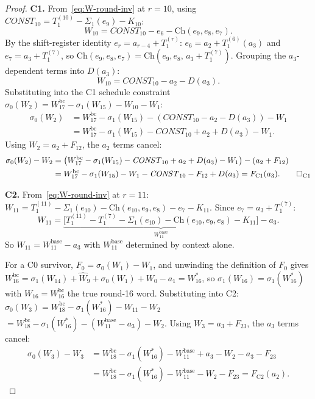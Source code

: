 \documentclass[11pt,a4paper]{article}
\newcommand{\Sig}[1]{\Sigma_{#1}}
\newcommand{\sig}[1]{\sigma_{#1}}
\newcommand{\Ch}{\mathrm{Ch}}
\begin{document}
\begin{proof}
\textbf{C1.}  From~\eqref{eq:W-round-inv} at $r=10$,
using $\mathit{CONST}_{10} = T_1^{(10)} - \Sig{1}(e_9) - K_{10}$:
\[
  W_{10} = \mathit{CONST}_{10} - e_6 - \Ch(e_9,e_8,e_7).
\]
By the shift-register identity $e_r = a_{r-4} + T_1^{(r)}$:
$e_6 = a_2 + T_1^{(6)}(a_3)$ and $e_7 = a_3 + T_1^{(7)}$, so
$\Ch(e_9,e_8,e_7) = \Ch(e_9,e_8,\,a_3+T_1^{(7)})$.
Grouping the $a_3$-dependent terms into $D(a_3)$:
\[
  W_{10} = \mathit{CONST}_{10} - a_2 - D(a_3).
\]
Substituting into the C1 schedule constraint
$\sig{0}(W_2) = W_{17}^{\mathrm{bc}} - \sig{1}(W_{15}) - W_{10} - W_1$:
\begin{align*}
  \sig{0}(W_2)
  &= W_{17}^{\mathrm{bc}} - \sig{1}(W_{15})
    - (\mathit{CONST}_{10} - a_2 - D(a_3)) - W_1 \\
  &= W_{17}^{\mathrm{bc}} - \sig{1}(W_{15}) - \mathit{CONST}_{10}
    + a_2 + D(a_3) - W_1.
\end{align*}
Using $W_2 = a_2 + F_{12}$, the $a_2$ terms cancel:
\begin{align*}
  \sig{0}(W_2) - W_2
  &= \bigl(W_{17}^{\mathrm{bc}} - \sig{1}(W_{15}) - \mathit{CONST}_{10}
     + a_2 + D(a_3) - W_1\bigr) - (a_2 + F_{12})\\
  &= W_{17}^{\mathrm{bc}} - \sig{1}(W_{15}) - W_1
     - \mathit{CONST}_{10} - F_{12} + D(a_3)
   = F_{\mathrm{C1}}(a_3). \qed_{\text{C1}}
\end{align*}

\textbf{C2.}  From~\eqref{eq:W-round-inv} at $r=11$:
$W_{11} = T_1^{(11)} - \Sig{1}(e_{10}) - \Ch(e_{10},e_9,e_8) - e_7 - K_{11}$.
Since $e_7 = a_3 + T_1^{(7)}$:
\[
  W_{11} = \underbrace{\bigl[T_1^{(11)} - T_1^{(7)} - \Sig{1}(e_{10})
             - \Ch(e_{10},e_9,e_8) - K_{11}\bigr]}_{W_{11}^{\mathrm{base}}} - a_3.
\]
So $W_{11} = W_{11}^{\mathrm{base}} - a_3$ with $W_{11}^{\mathrm{base}}$ determined
by context alone.

For a C0 survivor, $F_0 = \sig{0}(W_1) - W_1$, and unwinding the definition of $F_0$ gives $W_{16}^{\mathrm{bc}} = \sig{1}(W_{14}) + \hat W_9 + \sig{0}(W_1) + W_0 - a_1 = W_{16}^*$, so $\sig{1}(W_{16}) = \sig{1}(W_{16}^*)$ with $W_{16}=W_{16}^{\mathrm{bc}}$ the true round-16 word.
Substituting into C2:
$\sig{0}(W_3) = W_{18}^{\mathrm{bc}} - \sig{1}(W_{16}^*) - W_{11} - W_2$
$= W_{18}^{\mathrm{bc}} - \sig{1}(W_{16}^*) - (W_{11}^{\mathrm{base}} - a_3) - W_2$.
Using $W_3 = a_3 + F_{23}$, the $a_3$ terms cancel:
\begin{align*}
  \sig{0}(W_3) - W_3
  &= W_{18}^{\mathrm{bc}} - \sig{1}(W_{16}^*) - W_{11}^{\mathrm{base}}
     + a_3 - W_2 - a_3 - F_{23}\\
  &= W_{18}^{\mathrm{bc}} - \sig{1}(W_{16}^*) - W_{11}^{\mathrm{base}}
     - W_2 - F_{23}
   = F_{\mathrm{C2}}(a_2).
\end{align*}
\end{proof}
\end{document}
